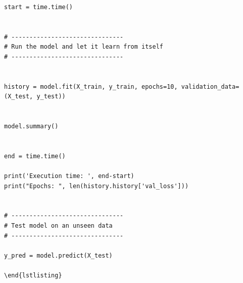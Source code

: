 \documentclass[a4paper,oneside,openright,11pt]{book}
\begin{document}
\begin{verbatim}
start = time.time()


# -------------------------------
# Run the model and let it learn from itself
# -------------------------------


history = model.fit(X_train, y_train, epochs=10, validation_data=(X_test, y_test))


model.summary()


end = time.time()

print('Execution time: ', end-start)
print("Epochs: ", len(history.history['val_loss']))


# -------------------------------
# Test model on an unseen data
# -------------------------------

y_pred = model.predict(X_test)

\end{lstlisting}
\end{verbatim}

\printbibliography[
heading=bibintoc,
title={Bibliography}
]



\end{document}
